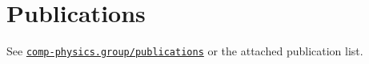 \documentclass[11pt]{article}
\begin{document}
\section{Publications}

See \href{https://comp-physics.group/publications}{\texttt{comp-physics.group/publications}} or the attached publication list.









\end{document}
